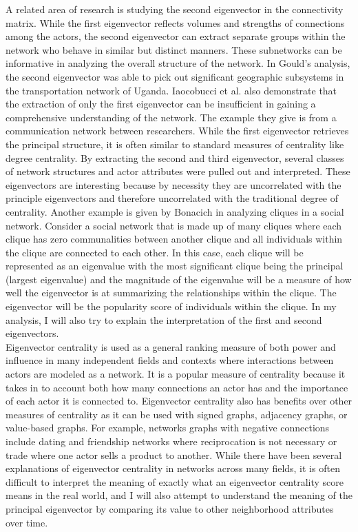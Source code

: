 \documentclass{article}
\theoremstyle{definition}
\theoremstyle{remark}
\begin{document}
A related area of research is studying the second eigenvector in the connectivity matrix.  While the first eigenvector reflects volumes and strengths of connections among the actors, the second eigenvector can extract separate groups within the network who behave in similar but distinct manners.  These subnetworks can be informative in analyzing the overall structure of the network.  In Gould’s analysis, the second eigenvector was able to pick out significant geographic subsystems in the transportation network of Uganda.  Iaocobucci et al. also demonstrate that the extraction of only the first eigenvector can be insufficient in gaining a comprehensive understanding of the network.\cite{iacobucci2017eigenvector}  The example they give is from a communication network between researchers.  While the first eigenvector retrieves the principal structure, it is often similar to standard measures of centrality like degree centrality.  By extracting the second and third eigenvector, several classes of network structures and actor attributes were pulled out and interpreted.  These eigenvectors are interesting because by necessity they are uncorrelated with the principle eigenvectors and therefore uncorrelated with the traditional degree of centrality.  Another example is given by Bonacich in analyzing cliques in a social network.\cite{bonacich1972factoring}  Consider a social network that is made up of many cliques where each clique has zero communalities between another clique and all individuals within the clique are connected to each other.  In this case, each clique will be represented as an eigenvalue with the most significant clique being the principal (largest eigenvalue) and the magnitude of the eigenvalue will be a measure of how well the eigenvector is at summarizing the relationships within the clique.  The eigenvector will be the popularity score of individuals within the clique.  In my analysis, I will also try to explain the interpretation of the first and second eigenvectors. \\

Eigenvector centrality is used as a general ranking measure of both power and influence in many independent fields and contexts where interactions between actors are modeled as a network.  It is a popular measure of centrality because it takes in to account both how many connections an actor has and the importance of each actor it is connected to.  Eigenvector centrality also has benefits over other measures of centrality as it can be used with signed graphs, adjacency graphs, or value-based graphs.  For example, networks graphs with negative connections include dating and friendship networks where reciprocation is not necessary or trade where one actor sells a product to another.  While there have been several explanations of eigenvector centrality in networks across many fields, it is often difficult to interpret the meaning of exactly what an eigenvector centrality score means in the real world, and I will also attempt to understand the meaning of the principal eigenvector by comparing its value to other neighborhood attributes over time.  \\
\end{document}
